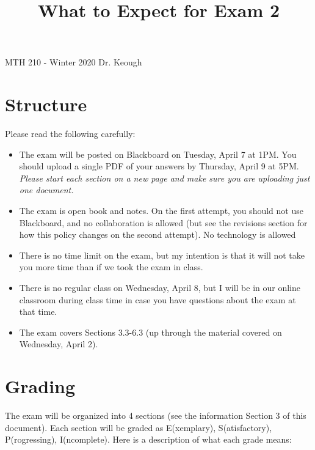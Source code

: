 \documentclass[12pt]{amsart}
\title{What to Expect for Exam 2
}
\theoremstyle{definition}
\begin{document}
MTH 210 - Winter 2020 \hfill Dr. Keough\\

\maketitle

\vspace{-.3in}

\section{Structure }
Please read the following carefully:
\begin{itemize}
\item The exam will be posted on Blackboard on Tuesday, April 7 at 1PM. You should upload a single PDF of your answers by Thursday, April 9 at 5PM. \emph{Please start each section on a new page and make sure you are uploading just one document.}
\item The exam is open book and notes. On the first attempt, you should not use Blackboard, and no collaboration is allowed (but see the revisions section for how this policy changes on the second attempt). No technology is allowed
\item There is no time limit on the exam, but my intention is that it will not take you more time than if we took the exam in class.
\item  There is no regular class on Wednesday, April 8, but I will be in our online classroom during class time in case you have questions about the exam at that time. \item The exam covers Sections 3.3-6.3 (up through the material covered on Wednesday, April 2).
\end{itemize}
\vspace{-.2in}
\section{Grading}

The exam will be organized into 4 sections (see the information Section 3 of this document). Each section will be graded as E(xemplary), S(atisfactory), P(rogressing), I(ncomplete). Here is a description of what each grade means:
\end{document}
